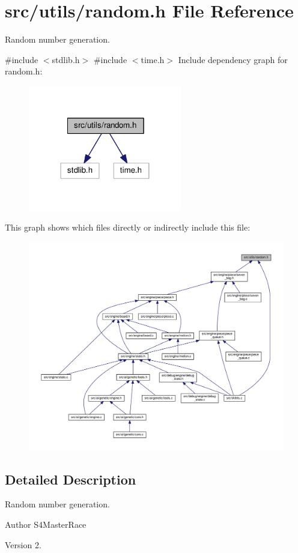 \section{src/utils/random.h File Reference}
\label{random_8h}


Random number generation.  


{\ttfamily \#include $<$stdlib.\+h$>$}\newline
{\ttfamily \#include $<$time.\+h$>$}\newline
Include dependency graph for random.\+h\+:
\nopagebreak
\begin{figure}[H]
\begin{center}
\leavevmode
\includegraphics[width=190pt]{random_8h__incl}
\end{center}
\end{figure}
This graph shows which files directly or indirectly include this file\+:
\nopagebreak
\begin{figure}[H]
\begin{center}
\leavevmode
\includegraphics[width=350pt]{random_8h__dep__incl}
\end{center}
\end{figure}


\subsection{Detailed Description}
Random number generation. 

\begin{DoxyAuthor}{Author}
S4\+Master\+Race 
\end{DoxyAuthor}
\begin{DoxyVersion}{Version}
2. 
\end{DoxyVersion}
